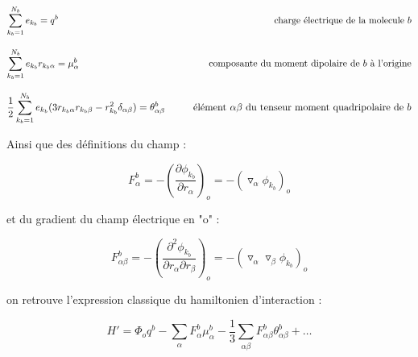 	\begin{flushleft}
		\begin{equation*}
		\sum_{k_{b}=1}^{N_{b}} e_{k_{b}} = q^{b} \hspace{8.1cm}\textup{charge électrique de la molecule $b$}     
		\end{equation*}
	\end{flushleft}
	
	\begin{flushleft}
		\begin{equation*}
		\sum_{k_{b}=1}^{N_{b}} e_{k_{b}} r_{k_{b}\alpha} = \mu_{\alpha}^{b}  \hspace{4.8cm} \textup{composante du moment dipolaire de $b$ à l'origine}
		\end{equation*}
	\end{flushleft}
	
	
	\begin{flushleft}
		\begin{equation*}
		\frac{1}{2} \sum_{k_{b}=1}^{N_{b}} e_{k_{b}} (3r_{k_{b}\alpha} r_{k_{b}\beta}- r^{2}_{k_{b}}\delta_{\alpha \beta}) = \theta_{\alpha \beta}^{b}  \hspace{1cm} \textup{élément $\alpha\beta$ du tenseur moment quadripolaire de $b$}
		\end{equation*}
	\end{flushleft}
	
	Ainsi que des définitions du champ :
	
	\begin{equation}
	F_{\alpha}^{b} = - \left(\frac{\partial \phi_{k_{b}}}{\partial r_{\alpha}}\right)_{o} = - (\triangledown_{\alpha} \phi_{k_{b}})_{o} \label{1.11}
	\end{equation}
	
	et du gradient du champ électrique en "o" : 
	
	\begin{equation}
	F_{\alpha\beta}^{b} = - \left(\frac{\partial^{2} \phi_{k_{b}}}{\partial r_{\alpha} \partial r_{\beta}}\right)_{o} = - (\triangledown_{\alpha} \triangledown_{\beta} \phi_{k_{b}})_{o} \label{1.12}
	\end{equation}
	
	on retrouve l'expression classique du hamiltonien d'interaction : 
	
	\begin{equation}
	H' = \Phi_{o} q^{b} - \sum_{\alpha} F_{\alpha}^{b} \mu_{\alpha}^{b} - \frac{1}{3} \sum_{\alpha\beta} F_{\alpha\beta}^{b} \theta_{\alpha\beta}^{b} + \ldots
	\end{equation}
	

